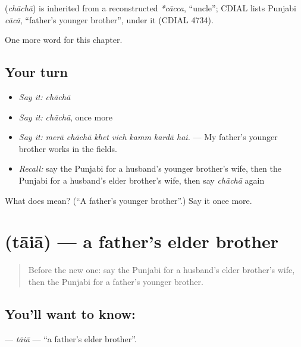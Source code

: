 \begin{cousinweb}
\textbf{} (\emph{chāchā}) is inherited from a reconstructed \emph{*cācca}, \textquotedblleft{}uncle\textquotedblright{}; CDIAL lists Punjabi \emph{cācā}, \textquotedblleft{}father's younger brother\textquotedblright{}, under it (CDIAL 4734).
\end{cousinweb}

\begin{grammarlens}[title={What you've built}]
One more word for this chapter.
\end{grammarlens}

\subsection*{Your turn}
\begin{itemize}
\raggedright
  \item \emph{Say it:} \emph{chāchā}
  \item \emph{Say it:} \emph{chāchā}, once more
  \item \emph{Say it:} \emph{merā chāchā khet vich kamm kardā hai.} — My father's younger brother works in the fields.
  \item \emph{Recall:} say the Punjabi for a husband's younger brother's wife, then the Punjabi for a husband's elder brother's wife, then say \emph{chāchā} again
\end{itemize}

\begin{tcolorbox}[breakable,colback=teal!4,colframe=teal!35!black,title={Before you move on}]
What does  mean? (\textquotedblleft{}A father's younger brother\textquotedblright{}.) Say it once more.
\end{tcolorbox}
\section[\texorpdfstring{\pa{ਤਾਇਆ} (tāiā)}{ਤਾਇਆ (tāiā)}]{ (tāiā) — a father's elder brother}

\label{lesson:PA-C331-taia}



\begin{quote}
Before the new one: say the Punjabi for a husband's elder brother's wife, then the Punjabi for a father's younger brother.
\end{quote}

\subsection*{You'll want to know: }
\textbf{} — \emph{tāiā} — \textquotedblleft{}a father's elder brother\textquotedblright{}.

